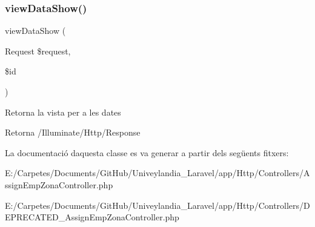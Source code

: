 \subsubsection{\texorpdfstring{view\+Data\+Show()}{viewDataShow()}}
{\footnotesize\ttfamily view\+Data\+Show (\begin{DoxyParamCaption}\item[{Request}]{\$request,  }\item[{}]{\$id }\end{DoxyParamCaption})}

Retorna la vista per a les dates

\begin{DoxyReturn}{Retorna}
/\+Illuminate/\+Http/\+Response 
\end{DoxyReturn}


La documentació d\textquotesingle{}aquesta classe es va generar a partir dels següents fitxers\+:\begin{DoxyCompactItemize}
\item 
E\+:/\+Carpetes/\+Documents/\+Git\+Hub/\+Univeylandia\+\_\+\+Laravel/app/\+Http/\+Controllers/Assign\+Emp\+Zona\+Controller.\+php\item 
E\+:/\+Carpetes/\+Documents/\+Git\+Hub/\+Univeylandia\+\_\+\+Laravel/app/\+Http/\+Controllers/D\+E\+P\+R\+E\+C\+A\+T\+E\+D\+\_\+\+Assign\+Emp\+Zona\+Controller.\+php\end{DoxyCompactItemize}
